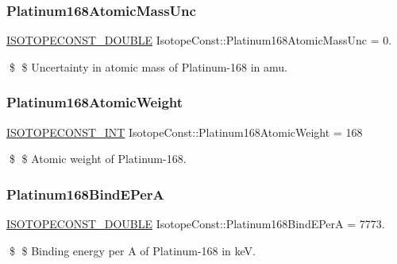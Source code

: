 \subsubsection{\texorpdfstring{Platinum168\+Atomic\+Mass\+Unc}{Platinum168AtomicMassUnc}}
{\footnotesize\ttfamily \mbox{\hyperlink{group___isotope_const-_macros_ga8f45a7272ce02c0b4c65c44636ed719a}{I\+S\+O\+T\+O\+P\+E\+C\+O\+N\+S\+T\+\_\+\+D\+O\+U\+B\+LE}} Isotope\+Const\+::\+Platinum168\+Atomic\+Mass\+Unc = 0.}

\$ \$ Uncertainty in atomic mass of Platinum-\/168 in amu. \mbox{\label{group___isotope_const-_platinum-_pt168_ga91e38bede1b4e8f7bbd1a0a964498033}} 
\subsubsection{\texorpdfstring{Platinum168\+Atomic\+Weight}{Platinum168AtomicWeight}}
{\footnotesize\ttfamily \mbox{\hyperlink{group___isotope_const-_macros_ga5f18360b3e99483a35c32d789e62621c}{I\+S\+O\+T\+O\+P\+E\+C\+O\+N\+S\+T\+\_\+\+I\+NT}} Isotope\+Const\+::\+Platinum168\+Atomic\+Weight = 168}

\$ \$ Atomic weight of Platinum-\/168. \mbox{\label{group___isotope_const-_platinum-_pt168_ga9d6eb0b08e49d4e4fd6f88e23c8623dc}} 
\subsubsection{\texorpdfstring{Platinum168\+Bind\+E\+PerA}{Platinum168BindEPerA}}
{\footnotesize\ttfamily \mbox{\hyperlink{group___isotope_const-_macros_ga8f45a7272ce02c0b4c65c44636ed719a}{I\+S\+O\+T\+O\+P\+E\+C\+O\+N\+S\+T\+\_\+\+D\+O\+U\+B\+LE}} Isotope\+Const\+::\+Platinum168\+Bind\+E\+PerA = 7773.}

\$ \$ Binding energy per A of Platinum-\/168 in keV. \mbox{\label{group___isotope_const-_platinum-_pt168_ga9eb809306f7cbec476fd9466c0bf9619}} 
